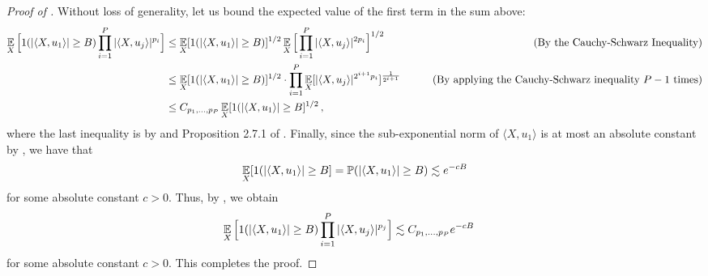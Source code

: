 \begin{proof}[Proof of ]
Without loss of generality, let us bound the expected value of the first term in the sum above:
\begin{align}
\operatorname*{\mathbb{E}}_X \Big[ 1(|\langle X, u_1 \rangle| \geq B) \prod_{i = 1}^P |\langle X, u_j \rangle|^{p_i} \Big]
& \leq \operatorname*{\mathbb{E}}_X [1( |\langle X, u_1 \rangle| \geq B)]^{1/2} \operatorname*{\mathbb{E}}_X \Big[ \prod_{i = 1}^P |\langle X, u_j \rangle|^{2p_i} \Big]^{1/2}
& \tag{By the Cauchy-Schwarz Inequality} \\
& \leq \operatorname*{\mathbb{E}}_X [1( |\langle X, u_1 \rangle| \geq B)]^{1/2} \cdot \prod_{i = 1}^P \operatorname*{\mathbb{E}}_X [|\langle X, u_j \rangle|^{2^{i + 1} p_i}]^{\frac{1}{2^{i + 1}}}
& \tag{By applying the Cauchy-Schwarz inequality $P - 1$ times} \\
& \leq C_{p_1, \ldots, p_P} \operatorname*{\mathbb{E}}_X[1(|\langle X, u_1 \rangle| \geq B]^{1/2} \,,
& \label{eq:final_cauchy_schwarz_prob_bound}
\end{align}
where the last inequality is by  and Proposition 2.7.1 of \citet{vershynin2018high}. Finally, since the sub-exponential norm of $\langle X, u_1 \rangle$ is at most an absolute constant by , we have that
\begin{align}
\operatorname*{\mathbb{E}}_X[1(|\langle X, u_1 \rangle| \geq B] = \mathbb{P}(|\langle X, u_1 \rangle| \geq B) \lesssim e^{-cB}
\end{align}
for some absolute constant $c > 0$. Thus, by , we obtain
\begin{align}
\operatorname*{\mathbb{E}}_X \Big[ 1(|\langle X, u_1 \rangle| \geq B) \prod_{i = 1}^P |\langle X, u_j \rangle|^{p_j} \Big]
& \lesssim C_{p_1, \ldots, p_P} e^{-cB}
\end{align}
for some absolute constant $c > 0$. This completes the proof.
\end{proof}

